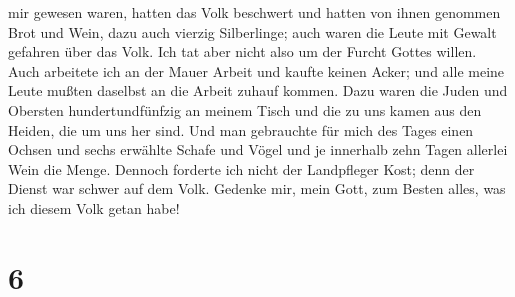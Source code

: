 mir gewesen waren, hatten das Volk beschwert und hatten von ihnen
genommen Brot und Wein, dazu auch vierzig Silberlinge; auch waren die
Leute mit Gewalt gefahren über das Volk. Ich tat aber nicht also um der
Furcht Gottes willen.  Auch arbeitete ich an der Mauer
Arbeit und kaufte keinen Acker; und alle meine Leute mußten daselbst an
die Arbeit zuhauf kommen.  Dazu waren die Juden und
Obersten hundertundfünfzig an meinem Tisch und die zu uns kamen aus den
Heiden, die um uns her sind.  Und man gebrauchte für mich
des Tages einen Ochsen und sechs erwählte Schafe und Vögel und je
innerhalb zehn Tagen allerlei Wein die Menge. Dennoch forderte ich nicht
der Landpfleger Kost; denn der Dienst war schwer auf dem Volk.
 Gedenke mir, mein Gott, zum Besten alles, was ich diesem
Volk getan habe!

\hypertarget{section-5}{%
\section{6}\label{section-5}}

